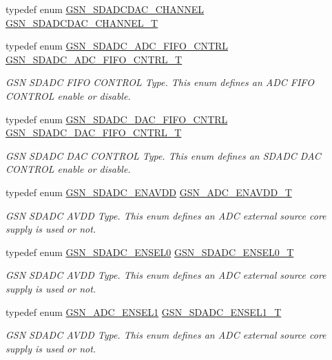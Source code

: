 \begin{DoxyCompactItemize}
typedef enum \hyperlink{a00583_a56192ea32005a1a454642c75568557aa}{GSN\_\-SDADCDAC\_\-CHANNEL} \hyperlink{a00583_ad966c1e6c604f6107d0b76e6390e58ff}{GSN\_\-SDADCDAC\_\-CHANNEL\_\-T}
\item 
typedef enum \hyperlink{a00652_ga2935ec509d4dbac8b79ee30623d4c11f}{GSN\_\-SDADC\_\-ADC\_\-FIFO\_\-CNTRL} \hyperlink{a00652_gaf55aace91b55b8544afeb27482cc70d4}{GSN\_\-SDADC\_\-ADC\_\-FIFO\_\-CNTRL\_\-T}
\begin{DoxyCompactList}\small\item\em GSN SDADC FIFO CONTROL Type. This enum defines an ADC FIFO CONTROL enable or disable. \end{DoxyCompactList}\item 
typedef enum \hyperlink{a00652_ga3309e966fa4f0d2d297dae6a3bed9599}{GSN\_\-SDADC\_\-DAC\_\-FIFO\_\-CNTRL} \hyperlink{a00652_ga1a95b10a6598d0019aec9049a8e37f19}{GSN\_\-SDADC\_\-DAC\_\-FIFO\_\-CNTRL\_\-T}
\begin{DoxyCompactList}\small\item\em GSN SDADC DAC CONTROL Type. This enum defines an SDADC DAC CONTROL enable or disable. \end{DoxyCompactList}\item 
typedef enum \hyperlink{a00652_gadec6c3ec131e3065cf2061534dfdb320}{GSN\_\-SDADC\_\-ENAVDD} \hyperlink{a00652_ga46353c29cf1b862e0ab85b39b68176af}{GSN\_\-ADC\_\-ENAVDD\_\-T}
\begin{DoxyCompactList}\small\item\em GSN SDADC AVDD Type. This enum defines an ADC external source core supply is used or not. \end{DoxyCompactList}\item 
typedef enum \hyperlink{a00652_ga6258977695af5f9fbae5edbdc75d8387}{GSN\_\-SDADC\_\-ENSEL0} \hyperlink{a00652_ga00d5cf84ae6ccebc46f9cd2c1bb63af0}{GSN\_\-SDADC\_\-ENSEL0\_\-T}
\begin{DoxyCompactList}\small\item\em GSN SDADC AVDD Type. This enum defines an ADC external source core supply is used or not. \end{DoxyCompactList}\item 
typedef enum \hyperlink{a00652_ga7c8cd0e1bbc6163fd01b12c7f31f0550}{GSN\_\-ADC\_\-ENSEL1} \hyperlink{a00652_ga9cf5d5c5ebe5edb5cda45eb9a6e466ef}{GSN\_\-SDADC\_\-ENSEL1\_\-T}
\begin{DoxyCompactList}\small\item\em GSN SDADC AVDD Type. This enum defines an ADC external source core supply is used or not. \end{DoxyCompactList}\item 

\end{DoxyCompactItemize}
